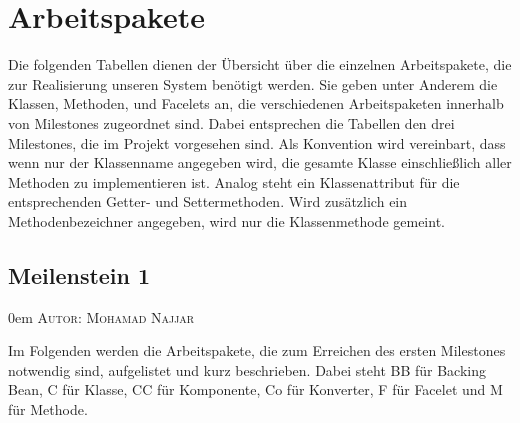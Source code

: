 \documentclass{article}
\makeatletter
\newcommand{\sectionauthor}[1]{
	{\parindent 0em \large \scshape Autor: #1 \par \nobreak \vspace*{1em}}
	\@afterheading
}
\makeatother
\begin{document}
\section{Arbeitspakete}

Die folgenden Tabellen dienen der Übersicht über die einzelnen Arbeitspakete, die zur Realisierung unseren System benötigt werden.
Sie geben unter Anderem die Klassen, Methoden, und Facelets an, die verschiedenen Arbeitspaketen innerhalb von Milestones zugeordnet sind. 
Dabei entsprechen die Tabellen den drei Milestones, die im Projekt vorgesehen sind.
Als Konvention wird vereinbart, dass wenn nur der Klassenname angegeben wird, die gesamte Klasse einschließlich aller Methoden zu implementieren ist. 
Analog steht ein Klassenattribut für die entsprechenden Getter- und Settermethoden.
Wird zusätzlich ein Methodenbezeichner angegeben, wird nur die Klassenmethode gemeint.


\subsection{Meilenstein 1}
\sectionauthor{Mohamad Najjar}
Im Folgenden werden die Arbeitspakete, die zum Erreichen des ersten Milestones notwendig sind, aufgelistet und kurz beschrieben. Dabei steht BB für Backing Bean, C für Klasse, CC für Komponente, Co für Konverter, F für Facelet und M für Methode.
\end{document}
